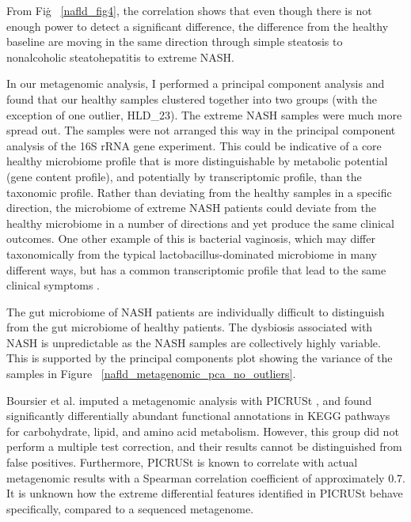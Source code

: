 From Fig\. ~\ref{nafld_fig4}, the correlation shows that even though there is not enough power to detect a significant difference, the difference from the healthy baseline are moving in the same direction through simple steatosis to nonalcoholic steatohepatitis to extreme NASH.

In our metagenomic analysis, I performed a principal component analysis and found that our healthy samples clustered together into two groups (with the exception of one outlier, HLD\_23). The extreme NASH samples were much more spread out. The samples were not arranged this way in the principal component analysis of the 16S rRNA gene experiment. This could be indicative of a core healthy microbiome profile that is more distinguishable by metabolic potential (gene content profile), and potentially by transcriptomic profile, than the taxonomic profile. Rather than deviating from the healthy samples in a specific direction, the microbiome of extreme NASH patients could deviate from the healthy microbiome in a number of directions and yet produce the same clinical outcomes. One other example of this is bacterial vaginosis, which may differ taxonomically from the typical lactobacillus-dominated microbiome in many different ways, but has a common transcriptomic profile that lead to the same clinical symptoms \cite{macklaim2013comparative}.

The gut microbiome of NASH patients are individually difficult to distinguish from the gut microbiome of healthy patients. The dysbiosis associated with NASH is unpredictable as the NASH samples are collectively highly variable. This is supported by the principal components plot showing the variance of the samples in Figure ~\ref{nafld_metagenomic_pca_no_outliers}.

Boursier et al. \cite{boursier2016severity} imputed a metagenomic analysis with PICRUSt \cite{langille2013predictive}, and found significantly differentially abundant functional annotations in KEGG pathways for carbohydrate, lipid, and amino acid metabolism. However, this group did not perform a multiple test correction, and their results cannot be distinguished from false positives. Furthermore, PICRUSt is known to correlate with actual metagenomic results with a Spearman correlation coefficient of approximately 0.7. It is unknown how the extreme differential features identified in PICRUSt behave specifically, compared to a sequenced metagenome.

